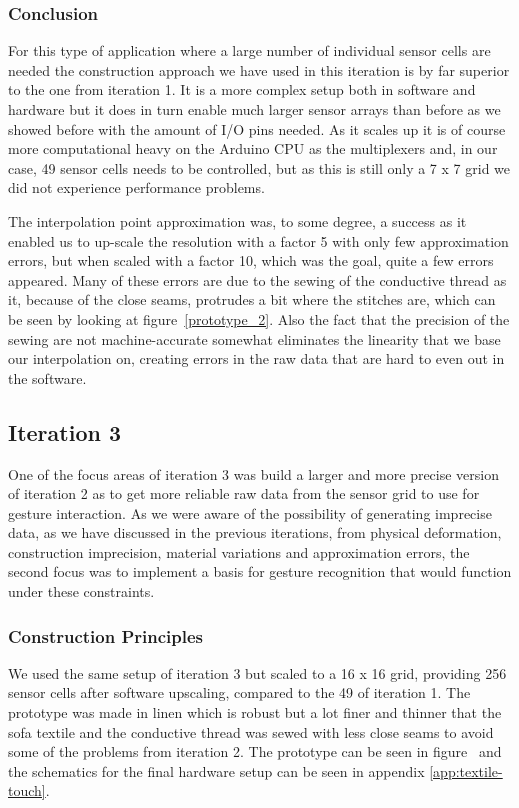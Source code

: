\subsubsection{Conclusion}
For this type of application where a large number of individual sensor cells are needed the construction approach we have used in this iteration is by far superior to the one from iteration 1.
It is a more complex setup both in software and hardware but it does in turn enable much larger sensor arrays than before as we showed before with the amount of I/O pins needed.
As it scales up it is of course more computational heavy on the Arduino CPU as the multiplexers and, in our case, 49 sensor cells needs to be controlled, but as this is still only a 7 x 7 grid we did not experience performance problems.

The interpolation point approximation was, to some degree, a success as it enabled us to up-scale the resolution with a factor 5 with only few approximation errors, but when scaled with a factor 10, which was the goal, quite a few errors appeared.
Many of these errors are due to the sewing of the conductive thread as it, because of the close seams, protrudes a bit where the stitches are, which can be seen by looking at figure~\ref{prototype_2}.
Also the fact that the precision of the sewing are not machine-accurate somewhat eliminates the linearity that we base our interpolation on, creating errors in the raw data that are hard to even out in the software.

\subsection{Iteration 3}
\label{ch:textiletouch:it3}
One of the focus areas of iteration 3 was build a larger and more precise version of iteration 2 as to get more reliable raw data from the sensor grid to use for gesture interaction.
As we were aware of the possibility of generating imprecise data, as we have discussed in the previous iterations, from physical deformation, construction imprecision, material variations and approximation errors, the second focus was to implement a basis for gesture recognition that would function under these constraints.

\subsubsection{Construction Principles}
We used the same setup of iteration 3 but scaled to a 16 x 16 grid, providing 256 sensor cells after software upscaling, compared to the 49 of iteration 1.
The prototype was made in linen which is robust but a lot finer and thinner that the sofa textile and the conductive thread was sewed with less close seams to avoid some of the problems from iteration 2.
The prototype can be seen in figure~ and the schematics for the final hardware setup can be seen in appendix \ref{app:textile-touch}.


